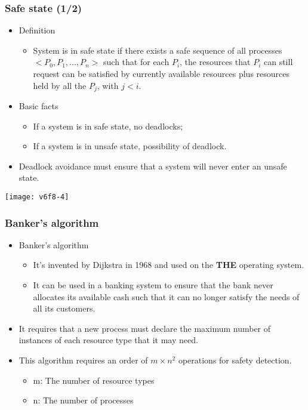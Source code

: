 \documentclass[CJKutf8,dvipsnames,table]{beamer}
\begin{document}
\begin{CJK*}{UTF8}{song}
  \begin{frame}
  \frametitle{Safe state (1/2)} \pause
  \begin{itemize}
  \item Definition  \pause
    \begin{itemize}
    \item System is in safe state if there exists a safe sequence of all processes $<P_0, P_1, ..., P_n>$ such that for each $P_i$, the resources that $P_i$ can still request can be satisfied by currently available resources plus resources held by all the $P_j$, with $j<i$.  \pause
    \end{itemize}
  \item Basic facts  \pause
    \begin{itemize}
    \item If a system is in safe state, no deadlocks;  \pause
    \item If a system is in unsafe state,  possibility of deadlock.  \pause
    \end{itemize}
  \item Deadlock avoidance must ensure that a system will never enter an unsafe state.  \pause
  \end{itemize}
  \begin{center}
	\texttt{[image: v6f8-4]}
  \end{center}
  \end{frame}


  \begin{frame}
  \frametitle{Banker's algorithm} \pause
  \begin{itemize}
  \item Banker's algorithm  \pause
    \begin{itemize}
    \item It's invented by Dijkstra in 1968 and used on the \textbf{THE} operating system.  \pause
    \item It can be used in a banking system to ensure that the bank never allocates its available cash such that it can no longer satisfy the needs of all its customers.  \pause
    \end{itemize}
  \item It requires that a new process must declare the maximum number of instances of each resource type that it may need.  \pause
  \item This algorithm requires an order of $m \times n^2$ operations for safety detection.  \pause
  \begin{itemize}
	\item m: The number of resource types  \pause
	\item n: The number of processes 
  \end{itemize}


\end{itemize}
\end{frame}
\end{CJK*}
\end{document}
